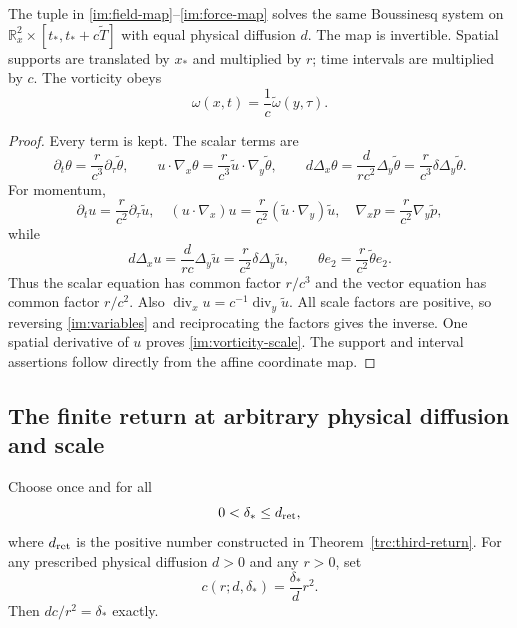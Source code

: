 \begin{proposition}\label{im:similarity}
The tuple in \eqref{im:field-map}--\eqref{im:force-map} solves the same
Boussinesq system on
$\mathbb R^2_x\times[t_*,t_*+c\widetilde T]$ with equal physical
diffusion $d$.  The map is invertible.  Spatial supports are translated
by $x_*$ and multiplied by $r$; time intervals are multiplied by $c$.
The vorticity obeys
\begin{equation}\label{im:vorticity-scale}
 \omega(x,t)=\frac1c\widetilde\omega(y,\tau).
\end{equation}
\end{proposition}

\begin{proof}
Every term is kept.  The scalar terms are
\[
 \partial_t\theta=\frac r{c^3}\partial_\tau\widetilde\theta,\qquad
 u\cdot\nabla_x\theta
 =\frac r{c^3}\widetilde u\cdot\nabla_y\widetilde\theta,\qquad
 d\Delta_x\theta
 =\frac{d}{rc^2}\Delta_y\widetilde\theta
 =\frac r{c^3}\delta\Delta_y\widetilde\theta.
\]
For momentum,
\[
 \partial_tu=\frac r{c^2}\partial_\tau\widetilde u,\quad
 (u\cdot\nabla_x)u=\frac r{c^2}
       (\widetilde u\cdot\nabla_y)\widetilde u,\quad
 \nabla_xp=\frac r{c^2}\nabla_y\widetilde p,
\]
while
\[
 d\Delta_xu=\frac d{rc}\Delta_y\widetilde u
 =\frac r{c^2}\delta\Delta_y\widetilde u,\qquad
 \theta e_2=\frac r{c^2}\widetilde\theta e_2.
\]
Thus the scalar equation has common factor $r/c^3$ and the vector
equation has common factor $r/c^2$.  Also
$\operatorname{div}_xu=c^{-1}\operatorname{div}_y\widetilde u$.
All scale factors are positive, so reversing
\eqref{im:variables} and reciprocating the factors gives the inverse.
One spatial derivative of $u$ proves \eqref{im:vorticity-scale}.
The support and interval assertions follow directly from the affine
coordinate map.
\end{proof}

\subsection{The finite return at arbitrary physical diffusion and scale}

Choose once and for all
\begin{equation}\label{im:delta-star}
 0<\delta_*\leq d_{\rm ret},
\end{equation}
where $d_{\rm ret}$ is the positive number constructed in
Theorem~\ref{trc:third-return}.  For any prescribed physical diffusion
$d>0$ and any $r>0$, set
\begin{equation}\label{im:parabolic-clock}
 c(r;d,\delta_*)=\frac{\delta_*}{d}r^2.
\end{equation}
Then $dc/r^2=\delta_*$ exactly.

